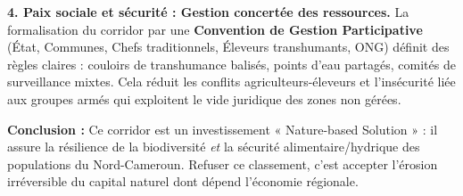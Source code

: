 \documentclass[11pt]{article}
\begin{document}
\begin{exoresolu}
    \par\medskip
    \textbf{4. Paix sociale et sécurité : Gestion concertée des ressources.}
    La formalisation du corridor par une \textbf{Convention de Gestion Participative} (État, Communes, Chefs traditionnels, Éleveurs transhumants, ONG) définit des règles claires : couloirs de transhumance balisés, points d'eau partagés, comités de surveillance mixtes. Cela réduit les conflits agriculteurs-éleveurs et l'insécurité liée aux groupes armés qui exploitent le vide juridique des zones non gérées.
    \par\medskip
    \textbf{Conclusion :} Ce corridor est un investissement « Nature-based Solution » : il assure la résilience de la biodiversité \emph{et} la sécurité alimentaire/hydrique des populations du Nord-Cameroun. Refuser ce classement, c'est accepter l'érosion irréversible du capital naturel dont dépend l'économie régionale.
\end{exoresolu}
\end{document}
